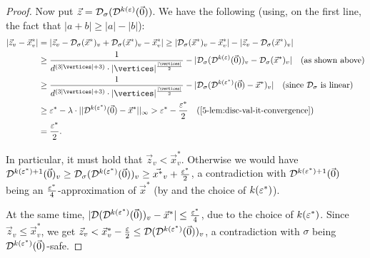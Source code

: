 \begin{proof}
\noindent
Now put $\vec{z}=\mathcal{D}_\sigma(\mathcal{D}^{k(\varepsilon)}(\vec{0}))$. We have the following (using, on the first line, the fact that $|a+b| \geq |a|-|b|$):
\begin{align*}
	|\vec{z}_v - \vec{x}^*_v| &=
 |\vec{z}_v-\discOP_\sigma(\vec{x}^*)_v+\discOP_\sigma(\vec{x}^*)_v-\vec{x}^*_v | 
\geq |\discOP_\sigma(\vec{x}^*)_v-\vec{x}^*_v | - |\vec{z}_v-\discOP_\sigma(\vec{x}^*)_v |  \\
	&\geq \frac{1}{d^{(3|\vertices|+3)}\cdot |\vertices|^{\frac{|\vertices|}{2}}} - |\discOP_\sigma(\discOP^{k(\eps)}(\vec{0}))_v-\discOP_\sigma(\vec{x}^*)_v |\quad (\text{as shown above})\\
	&\geq \frac{1}{d^{(3|\vertices|+3)}\cdot |\vertices|^{\frac{|\vertices|}{2}}} - |\discOP_{\sigma}(\discOP^{k(\eps^*)}(\vec{0}) - \vec{x}^*)_v|  \quad (\text{since $\discOP_{\sigma}$ is linear})\\
	&\geq \eps^* - \lambda\cdot||\discOP^{k(\eps^*)}(\vec{0}) - \vec{x}^* ||_{\infty}
	> \eps^* - \frac{\eps^*}{2}  \quad (\text{\Cref{5-lem:disc-val-it-convergence}})\\&=\frac{\eps^*}{2}.
%	
%	
%
\end{align*}

\noindent
In particular, it must hold that $\vec{z}_v< \vec{x}^*_v$. Otherwise we would have $\mathcal{D}^{k(\varepsilon^*)+1}(\vec{0})_v \geq \mathcal{D}_{\sigma}(\mathcal{D}^{k(\varepsilon^*)}(\vec{0}))_v \geq \vec{x^*}_v + \frac{\varepsilon^*}{2} $, a contradiction with $\mathcal{D}^{k(\varepsilon^*)+1}(\vec{0})$ being an $\frac{\varepsilon^*}{4}$-ap\-prox\-imation of $\vec{x}^*$ (by  and the choice of $k(\varepsilon^*)$).

At the same time, $|\mathcal{D}(\mathcal{D}^{k(\varepsilon^*)}(\vec{0}))_v - \vec{x}^*|\leq \frac{\varepsilon^*}{4}$, due to the choice of $k(\varepsilon^*)$. Since $\vec{z}_v \leq \vec{x}_v^*$, we get $\vec{z}_v < \vec{x}_v^* - \frac{\varepsilon}{2} \leq \mathcal{D}(\mathcal{D}^{k(\varepsilon^*)}(\vec{0}))_v$, a contradiction with $\sigma$ being $\mathcal{D}^{k(\varepsilon^*)}(\vec{0})$-safe. 
\end{proof}


